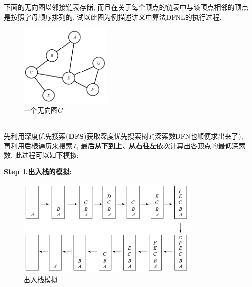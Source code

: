 \documentclass{article}
\begin{document}
\begin{homeworkProblem}

	下面的无向图以邻接链表存储, 而且在关于每个顶点的链表中与该顶点相邻的顶点是按照字母顺序排列的. 试以此图为例描述讲义中算法DFNL的执行过程.
	\begin{figure}[H]  %
		\centering
		\includegraphics[width=0.4\textwidth]{images/title/无向图G.pdf}
		\caption{一个无向图$G$}
		\label{fig:无向图G}
	\end{figure}

	\solution
	\\

	先利用深度优先搜索(\textbf{DFS})获取深度优先搜索树$T$(深索数DFN也顺便求出来了), 再利用后根遍历来搜索$T$, 最后\textbf{从下到上、从右往左}依次计算出各顶点的最低深索数. 此过程可以如下模拟:

	\textbf{Step 1.出入栈的模拟:}
	\begin{figure}[H]  %
		\centering
		\includegraphics[width=0.8\textwidth]{images/title/出入栈模拟.pdf}
		\caption{出入栈模拟}
		\label{fig:出入栈模拟}
	\end{figure}


\end{homeworkProblem}
\end{document}
